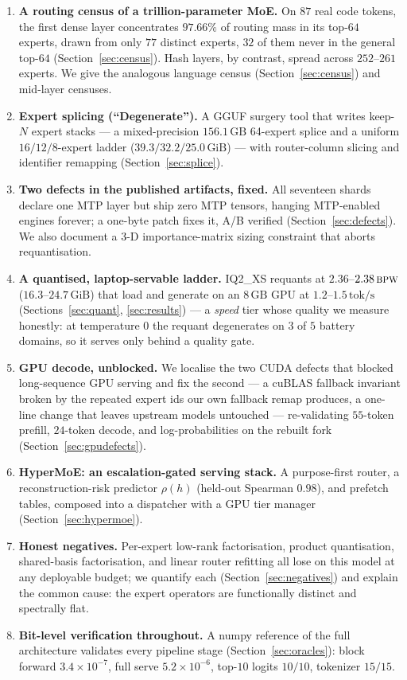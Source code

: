 \documentclass[11pt]{article}
\newcommand{\bpw}{\,\textsc{bpw}}
\newcommand{\gib}{\,\textrm{GiB}}
\newcommand{\gb}{\,\textrm{GB}}
\newcommand{\tps}{\,\textrm{tok/s}}
\begin{document}
\begin{enumerate}[leftmargin=1.4em]
  \item \textbf{A routing census of a trillion-parameter MoE.} On $87$ real code
    tokens, the first dense layer concentrates $97.66\%$ of routing mass in its
    top-$64$ experts, drawn from only $77$ distinct experts, $32$ of them never
    in the general top-$64$ (Section~\ref{sec:census}). Hash layers, by
    contrast, spread across $252$--$261$ experts. We give the analogous language
    census (Section~\ref{sec:census}) and mid-layer censuses.
  \item \textbf{Expert splicing (``Degenerate'').} A GGUF surgery tool that
    writes keep-$N$ expert stacks --- a mixed-precision $156.1\gb{}$
    64-expert splice and a uniform $16/12/8$-expert ladder
    ($39.3/32.2/25.0\gib{}$) --- with router-column slicing and identifier
    remapping (Section~\ref{sec:splice}).
  \item \textbf{Two defects in the published artifacts, fixed.} All seventeen
    shards declare one MTP layer but ship zero MTP tensors, hanging
    MTP-enabled engines forever; a one-byte patch fixes it, A/B verified
    (Section~\ref{sec:defects}). We also document a $3$-D importance-matrix
    sizing constraint that aborts requantisation.
  \item \textbf{A quantised, laptop-servable ladder.} IQ2\_XS requants at
    $2.36$--$2.38\bpw$ ($16.3$--$24.7\gib{}$) that load and generate on an
    $8\gb{}$ GPU at $1.2$--$1.5\tps{}$ (Sections~\ref{sec:quant},
    \ref{sec:results}) --- a \emph{speed} tier whose quality we measure
    honestly: at temperature $0$ the requant degenerates on $3$ of $5$ battery
    domains, so it serves only behind a quality gate.
  \item \textbf{GPU decode, unblocked.} We localise the two CUDA defects that
    blocked long-sequence GPU serving and fix the second --- a cuBLAS fallback
    invariant broken by the repeated expert ids our own fallback remap produces,
    a one-line change that leaves upstream models untouched --- re-validating
    $55$-token prefill, $24$-token decode, and log-probabilities on the rebuilt
    fork (Section~\ref{sec:gpudefects}).
  \item \textbf{HyperMoE: an escalation-gated serving stack.} A purpose-first
    router, a reconstruction-risk predictor $\rho(h)$ (held-out Spearman
    $0.98$), and prefetch tables, composed into a dispatcher with a GPU tier
    manager (Section~\ref{sec:hypermoe}).
  \item \textbf{Honest negatives.} Per-expert low-rank factorisation, product
    quantisation, shared-basis factorisation, and linear router refitting all
    lose on this model at any deployable budget; we quantify each
    (Section~\ref{sec:negatives}) and explain the common cause: the expert
    operators are functionally distinct and spectrally flat.
  \item \textbf{Bit-level verification throughout.} A numpy reference of the
    full architecture validates every pipeline stage
    (Section~\ref{sec:oracles}): block forward $3.4\times10^{-7}$, full serve
    $5.2\times10^{-6}$, top-$10$ logits $10/10$, tokenizer $15/15$.
\end{enumerate}
\end{document}

